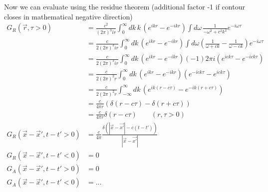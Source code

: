 \documentclass[10pt,a4paper]{book}
\theoremstyle{definition}
\begin{document}
\begin{itemize}
\begin{enumerate}
Now we can evaluate using the residue theorem (additional factor -1 if contour closes in mathematical negative direction)
\begin{align}
G_R(\vec{r},\tau>0)
&=\frac{c^2}{(2\pi)^3ir}\int_0^\infty dk\,k\,(e^{ikr}-e^{-ikr}) \int d\omega\,\frac{1}{-\omega^2+c^2k^2}e^{-i\omega\tau}\\
&=\frac{c}{2(2\pi)^3ir}\int_0^\infty dk\,(e^{ikr}-e^{-ikr}) \int d\omega\left(\frac{1}{\omega+ck}-\frac{1}{\omega-ck}\right)e^{-i\omega\tau}\\
&=\frac{c}{2(2\pi)^3ir}\int_0^\infty dk\,(e^{ikr}-e^{-ikr})(-1)2\pi i\left(e^{ick\tau}-e^{-ick\tau}\right)\\
&=\frac{c}{2(2\pi)^2r}\int_0^\infty dk\,(e^{ikr}-e^{-ikr})\left(e^{-ick\tau}-e^{ick\tau}\right)\\
&=\frac{c}{2(2\pi)^2r}\int_{-\infty}^\infty dk\,(e^{ik(r-c\tau)}-e^{-ik(r+c\tau)})\\
&=\frac{c}{4\pi r}\left(\delta(r-c\tau)-\delta(r+c\tau)\right)\\
&=\frac{c}{4\pi r}\delta(r-c\tau)\qquad(r,\tau>0)\\
G_R(\vec{x}-\vec{x}',t-t'>0)
&=\frac{c}{4\pi}\frac{\delta(|\vec{x}-\vec{x'}|-c(t-t'))}{|\vec{x}-\vec{x'}|}\\
G_R(\vec{x}-\vec{x}',t-t'<0)&=0\\
G_A(\vec{x}-\vec{x}',t-t'>0)&=0\\
G_A(\vec{x}-\vec{x}',t-t'<0)&=...
\end{align}
\end{enumerate}


\end{itemize}
\end{document}
